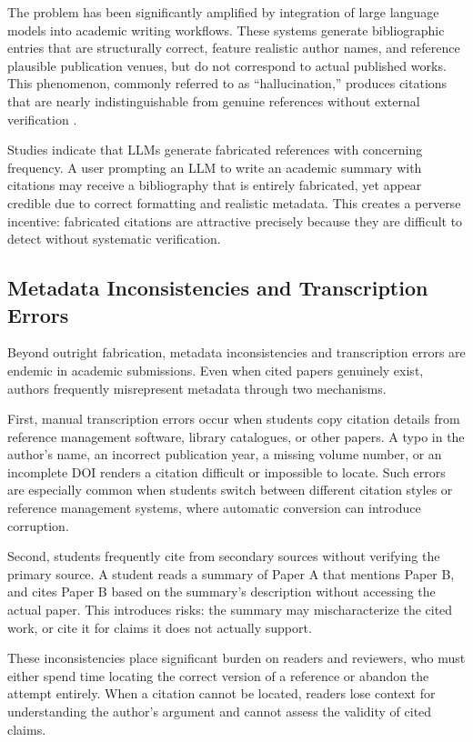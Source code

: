 \documentclass[12pt,a4paper,oneside]{report}
\begin{document}
The problem has been significantly amplified by integration of large language models into academic writing workflows. These systems generate bibliographic entries that are structurally correct, feature realistic author names, and reference plausible publication venues, but do not correspond to actual published works. This phenomenon, commonly referred to as ``hallucination,'' produces citations that are nearly indistinguishable from genuine references without external verification \cite{ji2023survey}.

Studies indicate that LLMs generate fabricated references with concerning frequency\cite{ji2023survey}. A user prompting an LLM to write an academic summary with citations may receive a bibliography that is entirely fabricated, yet appear credible due to correct formatting and realistic metadata. This creates a perverse incentive: fabricated citations are attractive precisely because they are difficult to detect without systematic verification.

\subsection{Metadata Inconsistencies and Transcription Errors}

Beyond outright fabrication, metadata inconsistencies and transcription errors are endemic in academic submissions. Even when cited papers genuinely exist, authors frequently misrepresent metadata through two mechanisms.

First, manual transcription errors occur when students copy citation details from reference management software, library catalogues, or other papers. A typo in the author's name, an incorrect publication year, a missing volume number, or an incomplete DOI renders a citation difficult or impossible to locate. Such errors are especially common when students switch between different citation styles or reference management systems, where automatic conversion can introduce corruption.

Second, students frequently cite from secondary sources without verifying the primary source. A student reads a summary of Paper A that mentions Paper B, and cites Paper B based on the summary's description without accessing the actual paper. This introduces risks: the summary may mischaracterize the cited work, or cite it for claims it does not actually support.

These inconsistencies place significant burden on readers and reviewers, who must either spend time locating the correct version of a reference or abandon the attempt entirely. When a citation cannot be located, readers lose context for understanding the author's argument and cannot assess the validity of cited claims.
\end{document}
